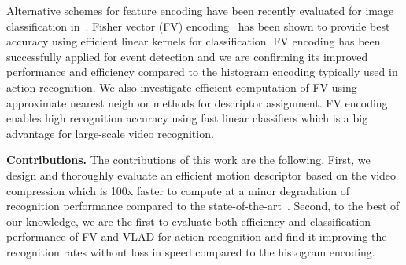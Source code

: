 Alternative schemes for feature encoding
have been recently evaluated for image classification
in~\cite{Chatfield11}.
Fisher vector (FV) encoding~\cite{Perronnin10} has been shown to provide best accuracy using efficient linear kernels for
classification. FV encoding has been successfully applied for
event detection \cite{Revaud13} and we are confirming its
improved performance and efficiency compared to the
histogram encoding typically used in action recognition. We also investigate efficient computation of FV using approximate
nearest neighbor methods for descriptor assignment. FV encoding enables high recognition accuracy using fast linear
classifiers which is a big advantage for large-scale video
recognition. \smallskip

\noindent\textbf{Contributions.} The contributions of this work are the following. First, we design and thoroughly evaluate an efficient motion descriptor based on the video compression which is 100x faster to compute at a minor degradation of recognition performance compared to the state-of-the-art~\cite{Wang12}. Second, to the best of our knowledge, we are the first to evaluate both efficiency and classification performance of FV and VLAD for action recognition and find it improving the recognition rates without loss in speed compared to the histogram encoding.

